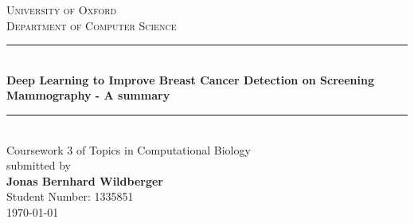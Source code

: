 \begin{titlepage}
	
	\begin{center}
		
		
		
		
		
		\textsc{\Large University of Oxford}\\[0.2cm]
		\textsc{Department of Computer Science}\\[0.2cm]
		\renewcommand{\HRule}{\rule{\linewidth}{0.5mm}}
		\HRule \\[.9cm]
		{ \huge \bfseries Deep Learning to Improve Breast Cancer Detection on Screening Mammography - A summary}\\[0.6cm]
	
		\HRule \\[1.3cm]
		
		{\LARGE Coursework 3 of Topics in Computational Biology} \\[0.3cm]  
		
		
		submitted by \\[0.3cm]  
		{\large \bfseries Jonas Bernhard Wildberger} \\
		{Student Number: 1335851}
		\\[12.5cm]  
		
		{\large \today}	
	\end{center}
	
	
\end{titlepage}
